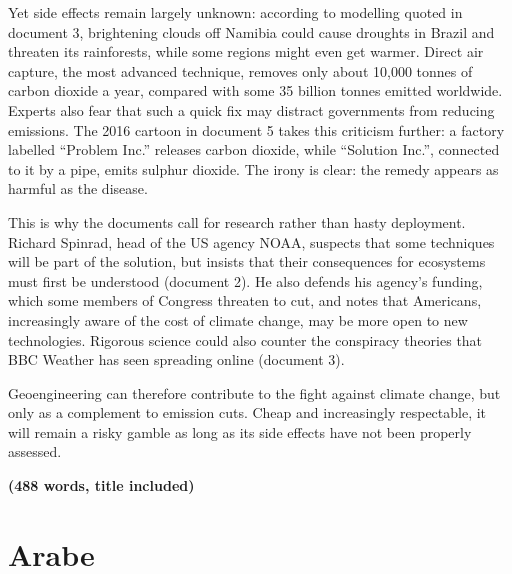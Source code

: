 \documentclass[11pt,a4paper]{article}
\begin{document}
Yet side effects remain largely unknown: according to modelling quoted in document 3, brightening clouds off Namibia could cause droughts in Brazil and threaten its rainforests, while some regions might even get warmer. Direct air capture, the most advanced technique, removes only about 10,000 tonnes of carbon dioxide a year, compared with some 35 billion tonnes emitted worldwide. Experts also fear that such a quick fix may distract governments from reducing emissions. The 2016 cartoon in document 5 takes this criticism further: a factory labelled ``Problem Inc.'' releases carbon dioxide, while ``Solution Inc.'', connected to it by a pipe, emits sulphur dioxide. The irony is clear: the remedy appears as harmful as the disease.

This is why the documents call for research rather than hasty deployment. Richard Spinrad, head of the US agency NOAA, suspects that some techniques will be part of the solution, but insists that their consequences for ecosystems must first be understood (document 2). He also defends his agency's funding, which some members of Congress threaten to cut, and notes that Americans, increasingly aware of the cost of climate change, may be more open to new technologies. Rigorous science could also counter the conspiracy theories that BBC Weather has seen spreading online (document 3).

Geoengineering can therefore contribute to the fight against climate change, but only as a complement to emission cuts. Cheap and increasingly respectable, it will remain a risky gamble as long as its side effects have not been properly assessed.

\textbf{(488 words, title included)}

\hypertarget{arabe}{%
\section{Arabe}\label{arabe}}
\end{document}
